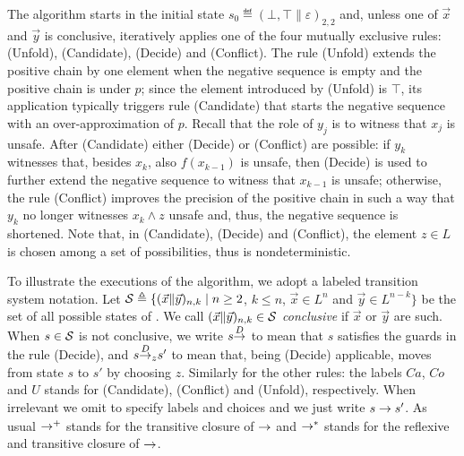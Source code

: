 The algorithm starts in the initial state $s_0 \eqdef ( \bot, \top \| \varepsilon )_{2,2}$ and, unless one of $\vec{x}$ and $\vec{y}$ is conclusive, iteratively applies one of the four mutually exclusive rules: (Unfold), (Candidate), (Decide) and (Conflict).
The rule (Unfold) extends the positive chain by one element when the negative sequence is empty and the positive chain is under $p$; since the element introduced by (Unfold) is $\top$, its application typically triggers rule (Candidate) that starts the negative sequence with an over-approximation of $p$. Recall that the role of $y_j$ is to witness that $x_j$ is unsafe. After (Candidate) either (Decide) or (Conflict) are possible: if $y_k$ witnesses that, besides $x_k$, also $f(x_{k-1})$ is unsafe, then (Decide) is used to further extend the negative sequence to witness that $x_{k-1}$ is unsafe; otherwise, the rule (Conflict) improves the precision of the positive chain in such a way that $y_k$ no longer witnesses $x_k \land z$ unsafe and, thus, the negative sequence is shortened.
Note that, in (Candidate), (Decide) and (Conflict), the element $z \in L$ is chosen among a set of possibilities, thus {\APDR} is nondeterministic.

To illustrate the executions of the algorithm, we adopt a labeled transition system notation. Let $\mathcal{S} \triangleq \{( \vec{x} \| \vec{y} )_{n,k} \mid n \geq 2$, $k\leq n$, $\vec{x}\in L^n$ and $\vec{y}\in L^{n-k}\}$ be the set of all possible states of {\APDR}. We call $( \vec{x} \| \vec{y} )_{n,k} \in \mathcal{S}$ \emph{conclusive} if $\vec{x}$ or $\vec{y}$ are such.
When $s \in \mathcal{S}$ is not conclusive, we write $s {\stackrel{D}{\to}}_{}$ to mean that $s$ satisfies the guards in the rule (Decide), and $s {\stackrel{D}{\to}}_{z} s'$ to mean that, being (Decide) applicable, {\APDR} moves from state $s$ to $s'$ by choosing $z$. Similarly for the other rules: the labels $\mathit{Ca}$, $\mathit{Co}$ and $U$ stands for (Candidate), (Conflict) and (Unfold), respectively.
When irrelevant we omit to specify labels and choices and we just write $s \stackrel{}{\to} s'$.
As usual $\stackrel{}{\to^+}$ stands for the transitive closure of $\stackrel{}{\to}$ and $\stackrel{}{\to^*}$ stands for the reflexive and transitive closure of $\stackrel{}{\to}$.

